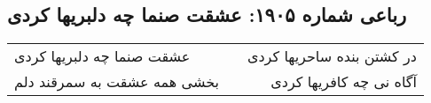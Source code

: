 \begin{center}
\section*{رباعی شماره ۱۹۰۵: عشقت صنما چه دلبریها کردی}
\label{sec:1905}
\begin{longtable}{l p{0.5cm} r}
عشقت صنما چه دلبریها کردی
&&
در کشتن بنده ساحریها کردی
\\
بخشی همه عشقت به سمرقند دلم
&&
آگاه نی چه کافریها کردی
\\
\end{longtable}
\end{center}
